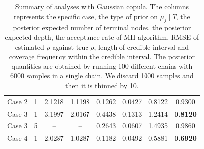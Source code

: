 \documentclass{amsart}
\begin{document}
\begin{table}[ht]
{\begin{tabular}{lc|cccccc}
		Case 2 & 1 & 2.1218 & 1.1198 & 0.1262 & 0.0427 & 0.8122 & 0.9300 \\ 
		Case 3 & 1 & 3.1997 & 2.0167 & 0.4438 & 0.1313 & 1.2414 & \textbf{0.8120} \\ 
		Case 3 & 5 & -- & -- & 0.2643 & 0.0607 & 1.4935 & 0.9860 \\
		Case 4 & 1 & 2.0287 & 1.0287 & 0.1182 & 0.0492 & 0.5881 & \textbf{0.6920} \\ 
		\bottomrule
		\end{tabular}}
	\caption{Summary of analyses with Gaussian copula. The columns represents the specific case, the type of prior on $\mu_j\mid T$, the posterior expected number of terminal nodes, the posterior expected depth, the acceptance rate of MH algorithm, RMSE of estimated $\rho$ against true $\rho$, length of credible interval and coverage frequency within the credible interval. The posterior quantities are obtained by running 100 different chains with 6000 samples in a single chain. We discard 1000 samples and then it is thinned by 10.}
	\label{tab:gauss:summary}
\end{table}
\end{document}
